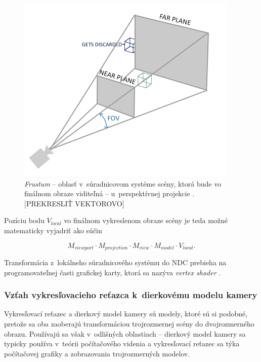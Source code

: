 \begin{figure}[h!]
    \centering
    \includegraphics[width=0.5\linewidth]{text_prace/obrazky-figures/perspektivna_projekcia_frustum.png}
    \caption[Frustum u~perspektívnej projekcie.]{\emph{Frustum} -- oblasť v~súradnicovom systéme scény, ktorá bude vo finálnom obraze viditeľná -- u~perspektívnej projekcie \cite{de_vries_coordinate_systems}. [PREKRESLIŤ VEKTOROVO]}
    \label{fig:perspektivna_projekcia_frustum}
\end{figure}

Pozíciu bodu $V_{local}$ vo finálnom vykreslenom obraze scény je teda možné matematicky vyjadriť ako súčin

$$ M_{viewport} \cdot M_{projection} \cdot M_{view} \cdot M_{model} \cdot V_{local} \mathrm{.}$$

Transformácia z~lokálneho súradnicového systému do NDC prebieha na programovateľnej časti grafickej karty, ktorá sa nazýva \emph{vertex shader} \cite{de_vries_coordinate_systems}.

\subsubsection{Vzťah vykresľovacieho reťazca k~dierkovému modelu kamery}

Vykresľovací reťazec a dierkový model kamery sú modely, ktoré sú si podobné, pretože sa oba zaoberajú transformáciou trojrozmernej scény do dvojrozmerného obrazu. Používajú sa však v~odlišných oblastiach -- dierkový model kamery sa typicky používa v~teórii počítačového videnia a vykresľovací reťazec sa týka počítačovej grafiky a zobrazovania trojrozmerných modelov.


